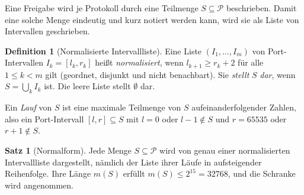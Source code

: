 \documentclass[a4paper,12pt, twoside]{report}
\theoremstyle{definition}
\newtheorem{definition}{Definition}
\newtheorem{satz}{Satz}
\begin{document}
Eine Freigabe wird je Protokoll durch eine Teilmenge $S\subseteq\mathcal{P}$ beschrieben. Damit eine solche Menge eindeutig und kurz notiert werden kann, wird sie als Liste von Intervallen geschrieben.

\begin{definition}[Normalisierte Intervallliste]
\label{def:normal}
	Eine Liste $(I_1,\ldots,I_m)$ von Port-Intervallen $I_k = [l_k,r_k]$ heißt \emph{normalisiert}, wenn $l_{k+1} \ge r_k + 2$ für alle $1 \le k < m$ gilt (geordnet, disjunkt und nicht benachbart). Sie \emph{stellt} $S$ \emph{dar}, wenn $S = \bigcup_k I_k$ ist. Die leere Liste stellt $\emptyset$ dar.
\end{definition}

Ein \emph{Lauf} von $S$ ist eine maximale Teilmenge von $S$ aufeinanderfolgender Zahlen, also ein Port-Intervall $[l,r]\subseteq S$ mit $l = 0$ oder $l-1\notin S$ und $r = 65535$ oder $r+1 \notin S$.

\begin{satz}[Normalform]
\label{satz:normalform}
	Jede Menge $S \subseteq \mathcal{P}$ wird von genau einer normalisierten Intervallliste dargestellt, nämlich der Liste ihrer Läufe in aufsteigender Reihenfolge. Ihre Länge $m(S)$ erfüllt $m(S) \le 2^{15} = 32768$, und die Schranke wird angenommen.
\end{satz}
\end{document}
